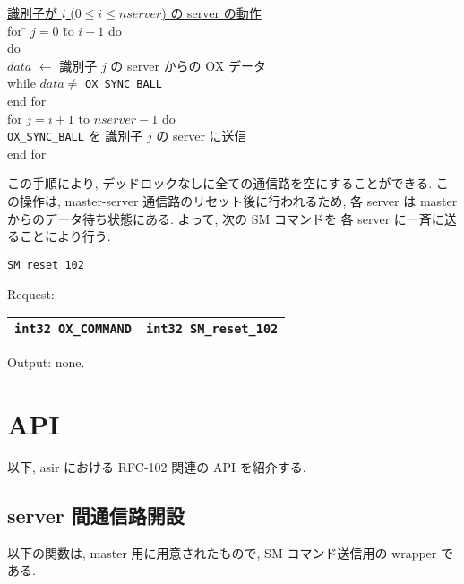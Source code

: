 \documentclass[12pt]{jarticle}
\begin{document}
\begin{tabbing}
\underline{識別子が $i$ ($0\le i \le nserver$) の server の動作}\\
for \= $j = 0$ \= to $i-1$ do\\
    \> do\\
    \>         \>$data$ $\leftarrow$ 識別子 $j$ の server からの OX データ\\
    \> while $data \neq$ {\tt OX\_SYNC\_BALL}\\
end for\\
for $j = i+1$ to $nserver-1$ do\\
    \> {\tt OX\_SYNC\_BALL} を 識別子 $j$ の server に送信\\
end for
\end{tabbing}
この手順により, デッドロックなしに全ての通信路を空にすることができる.
この操作は, master-server 通信路のリセット後に行われるため, 各 server
は master からのデータ待ち状態にある. よって, 次の SM コマンドを
各 server に一斉に送ることにより行う.

\begin{verbatim}
SM_reset_102
\end{verbatim}

Request:
\begin{tabular}{|c|c|}  \hline
{\tt int32 OX\_COMMAND} & {\tt int32 SM\_reset\_102} \\ \hline
\end{tabular}

Output: none.

\section{API}

以下, asir における RFC-102 関連の API を紹介する.

\subsection{server 間通信路開設}

以下の関数は, master 用に用意されたもので, SM コマンド送信用の
wrapper である.
\end{document}
